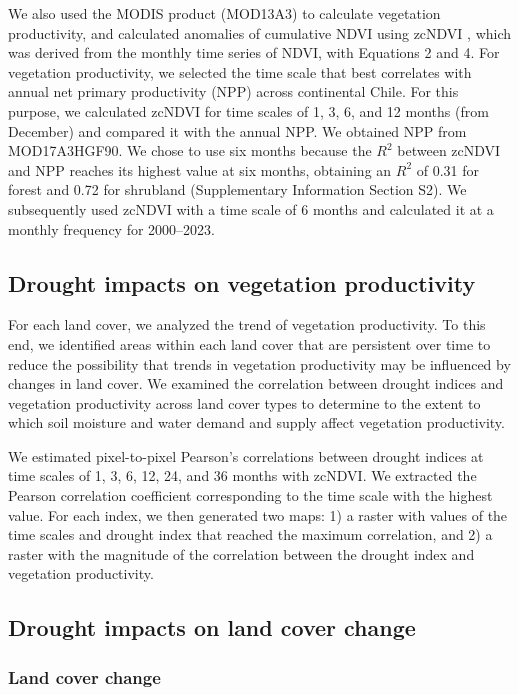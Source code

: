 \documentclass[
  sn-nature,
  numbered]{sn-jnl}
\begin{document}
We also used the MODIS product (MOD13A3\citep{Didan2015}) to calculate
vegetation productivity, and calculated anomalies of cumulative NDVI
using zcNDVI \citep{Zambrano2018}, which was derived from the monthly
time series of NDVI, with Equations 2 and 4. For vegetation
productivity, we selected the time scale that best correlates with
annual net primary productivity (NPP) across continental Chile. For this
purpose, we calculated zcNDVI for time scales of 1, 3, 6, and 12 months
(from December) and compared it with the annual NPP. We obtained NPP
from MOD17A3HGF90. We chose to use six months because the \(R^2\)
between zcNDVI and NPP reaches its highest value at six months,
obtaining an \(R^2\) of 0.31 for forest and 0.72 for shrubland
(Supplementary Information Section S2). We subsequently used zcNDVI with
a time scale of 6 months and calculated it at a monthly frequency for
2000--2023.

\subsection{Drought impacts on vegetation
productivity}\label{drought-impacts-on-vegetation-productivity}

For each land cover, we analyzed the trend of vegetation productivity.
To this end, we identified areas within each land cover that are
persistent over time to reduce the possibility that trends in vegetation
productivity may be influenced by changes in land cover. We examined the
correlation between drought indices and vegetation productivity across
land cover types to determine to the extent to which soil moisture and
water demand and supply affect vegetation productivity.

We estimated pixel-to-pixel Pearson's correlations between drought
indices at time scales of 1, 3, 6, 12, 24, and 36 months with zcNDVI. We
extracted the Pearson correlation coefficient corresponding to the time
scale with the highest value. For each index, we then generated two
maps: 1) a raster with values of the time scales and drought index that
reached the maximum correlation, and 2) a raster with the magnitude of
the correlation between the drought index and vegetation productivity.

\subsection{Drought impacts on land cover
change}\label{drought-impacts-on-land-cover-change}

\subsubsection{Land cover change}\label{land-cover-change}
\end{document}

